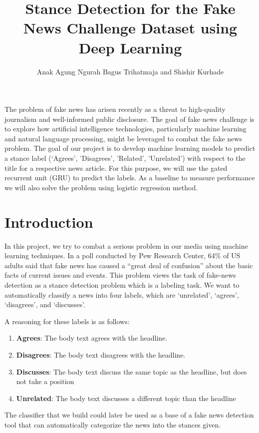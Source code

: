 \documentclass[11.5pt]{article}
\title{Stance Detection for the Fake News Challenge Dataset using Deep Learning}
\author{Anak Agung Ngurah Bagus Trihatmaja and Shishir Kurhade}
\date{}
\begin{document}
\maketitle

\abstract
The problem of fake news has arisen recently as a threat to high-quality 
journalism and well-informed public disclosure. The goal of fake news 
challenge is to explore how artificial intelligence technologies, particularly
machine learning and natural language processing, might be leveraged to combat 
the fake news problem\cite{fake_news_challenge}. The goal of our project is to develop machine learning 
models to predict a stance label (‘Agrees’, ’Disagrees’, ’Related’, ’Unrelated’) 
with respect to the title for a respective news article. For this purpose, we 
will use the gated recurrent unit (GRU) to predict the labels. As a baseline to 
measure performance we will also solve the problem using logistic regression method.

\vspace{2mm}
\section{Introduction}
In this project, we try to combat a serious problem in our media using machine 
learning techniques. In a poll conducted by Pew Research Center, 64\% of US 
adults said that fake news has caused a “great deal of confusion” about the 
basic facts of current issues and events\cite{barthel_mitchell_holcomb_2016}. 
This problem views the task of fake-news detection as a stance detection problem 
which is a labeling task. We want to automatically classify a news into four labels, 
which are ‘unrelated’, ‘agrees’, ‘disagrees’, and ‘discusses’.  

A reasoning for these labels is as follows:
\begin{enumerate}
  \item \textbf{Agrees}: The body text agrees with the headline.
  \item \textbf{Disagrees}: The body text disagrees with the headline.
  \item \textbf{Discusses}: The body text discuss the same topic as the headline, 
    but does not take a position
  \item \textbf{Unrelated}: The body text discusses a different topic than the headline
\end{enumerate}

The classifier that we build could later be used as a base of a 
fake news detection tool that can automatically categorize the news into the 
stances given.
\end{document}
